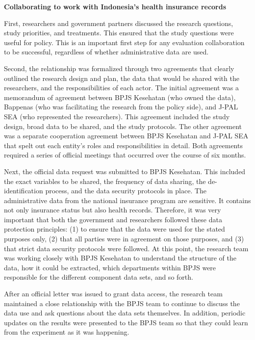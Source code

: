 \documentclass[
]{book}
\begin{document}
\begin{bbox}

\textbf{Collaborating to work with Indonesia's health insurance records}

First, researchers and government partners discussed the research questions, study priorities, and treatments. This ensured that the study questions were useful for policy. This is an important first step for any evaluation collaboration to be successful, regardless of whether administrative data are used.

Second, the relationship was formalized through two agreements that clearly outlined the research design and plan, the data that would be shared with the researchers, and the responsibilities of each actor. The initial agreement was a memorandum of agreement between BPJS Kesehatan (who owned the data), Bappenas (who was facilitating the research from the policy side), and J-PAL SEA (who represented the researchers). This agreement included the study design, broad data to be shared, and the study protocols. The other agreement was a separate cooperation agreement between BPJS Kesehatan and J-PAL SEA that spelt out each entity's roles and responsibilities in detail. Both agreements required a series of official meetings that occurred over the course of six months.

Next, the official data request was submitted to BPJS Kesehatan. This included the exact variables to be shared, the frequency of data sharing, the de-identification process, and the data security protocols in place. The administrative data from the national insurance program are sensitive. It contains not only insurance status but also health records. Therefore, it was very important that both the government and researchers followed these data protection principles: (1) to ensure that the data were used for the stated purposes only, (2) that all parties were in agreement on those purposes, and (3) that strict data security protocols were followed. At this point, the research team was working closely with BPJS Kesehatan to understand the structure of the data, how it could be extracted, which departments within BPJS were responsible for the different component data sets, and so forth.

After an official letter was issued to grant data access, the research team maintained a close relationship with the BPJS team to continue to discuss the data use and ask questions about the data sets themselves. In addition, periodic updates on the results were presented to the BPJS team so that they could learn from the experiment as it was happening.

\end{bbox}
\end{document}
